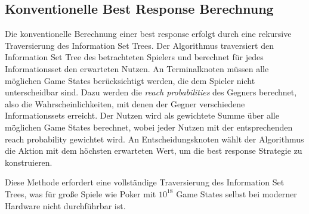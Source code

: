 \subsection{Konventionelle Best Response Berechnung}

Die konventionelle Berechnung einer best response erfolgt durch eine rekursive Traversierung des Information Set Trees.
Der Algorithmus traversiert den Information Set Tree des betrachteten Spielers und berechnet für jedes Informationsset den erwarteten Nutzen.
An Terminalknoten müssen alle möglichen Game States berücksichtigt werden, die dem Spieler nicht unterscheidbar sind.
Dazu werden die \emph{reach probabilities} des Gegners berechnet, also die Wahrscheinlichkeiten, mit denen der Gegner verschiedene Informationssets erreicht.
Der Nutzen wird als gewichtete Summe über alle möglichen Game States berechnet, wobei jeder Nutzen mit der entsprechenden reach probability gewichtet wird.
An Entscheidungsknoten wählt der Algorithmus die Aktion mit dem höchsten erwarteten Wert, um die best response Strategie zu konstruieren.

Diese Methode erfordert eine vollständige Traversierung des Information Set Trees, was für große Spiele wie Poker mit $10^{18}$ Game States selbst bei moderner Hardware nicht durchführbar ist.
